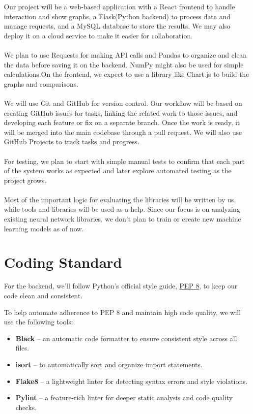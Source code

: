 \documentclass{article}
\begin{document}
Our project will be a web-based application with a React frontend to handle interaction and show graphs, a Flask(Python backend) to process data and manage requests, and a MySQL database to store the results. We may also deploy it on a cloud service to make it easier for collaboration.\\ \\
We plan to use Requests for making API calls and Pandas to organize and clean the data before saving it on the backend. NumPy might also be used for simple calculations.On the frontend, we expect to use a library like Chart.js to build the graphs and comparisons.\\ \\
We will use Git and GitHub for version control. Our workflow will be based on creating GitHub issues for tasks, linking the related work to those issues, and developing each feature or fix on a separate branch. Once the work is ready, it will be merged into the main codebase through a pull request. We will also use GitHub Projects to track tasks and progress.\\ \\
For testing, we plan to start with simple manual tests to confirm that each part of the system works as expected and later explore automated testing as the project grows.\\ \\
Most of the important logic for evaluating the libraries will be written by us, while tools and libraries will be used as a help. Since our focus is on analyzing existing neural network libraries, we don’t plan to train or create new machine learning models as of now.
\section{Coding Standard}

For the backend, we’ll follow Python’s official style guide, \href{https://peps.python.org/pep-0008/}{PEP 8}, to keep our code clean and consistent.

To help automate adherence to PEP 8 and maintain high code quality, we will use the following tools:
\begin{itemize}
  \item \textbf{Black} – an automatic code formatter to ensure consistent style across all files.
  \item \textbf{isort} – to automatically sort and organize import statements.
  \item \textbf{Flake8} – a lightweight linter for detecting syntax errors and style violations.
  \item \textbf{Pylint} – a feature-rich linter for deeper static analysis and code quality checks.
\end{itemize}
\end{document}
